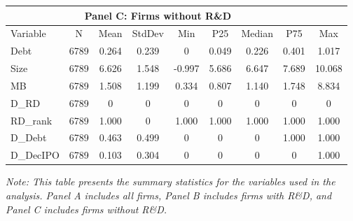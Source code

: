 \documentclass{article}
\begin{document}
\begin{table}[h!]
\begin{tabular}{lcccccccc}
        \midrule
        \multicolumn{8}{c}{Panel C: Firms without R\&D}                               \\
        \midrule
        Variable  & N     & Mean  & StdDev & Min    & P25   & Median & P75   & Max    \\
        \midrule
        Debt      & 6789  & 0.264 & 0.239  & 0      & 0.049 & 0.226  & 0.401 & 1.017  \\
        Size      & 6789  & 6.626 & 1.548  & -0.997 & 5.686 & 6.647  & 7.689 & 10.068 \\
        MB        & 6789  & 1.508 & 1.199  & 0.334  & 0.807 & 1.140  & 1.748 & 8.834  \\
        D\_RD     & 6789  & 0     & 0      & 0      & 0     & 0      & 0     & 0      \\
        RD\_rank  & 6789  & 1.000 & 0      & 1.000  & 1.000 & 1.000  & 1.000 & 1.000  \\
        D\_Debt   & 6789  & 0.463 & 0.499  & 0      & 0     & 0      & 1.000 & 1.000  \\
        D\_DecIPO & 6789  & 0.103 & 0.304  & 0      & 0     & 0      & 0     & 1.000  \\
        \bottomrule
    \end{tabular}
    \newline
    \textit{Note: This table presents the summary statistics for the variables used in the analysis. Panel A includes all firms, Panel B includes firms with R\&D, and Panel C includes firms without R\&D.}
\end{table}
\end{document}
